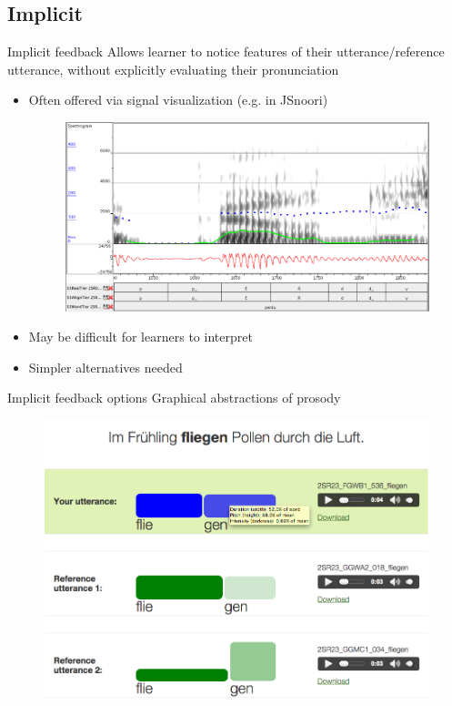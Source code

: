 \documentclass[xcolor={dvipsnames}]{beamer}
\begin{document}
	\subsection{Implicit}
		\begin{frame}{Implicit feedback}
		Allows learner to notice features of their utterance/reference utterance, without explicitly evaluating their pronunciation
		
		\begin{itemize}
		\item Often offered via signal visualization (e.g. in JSnoori)
			\begin{figure}
			\includegraphics[width=.75\textwidth]{JsnooriScreenshot}
			\end{figure}
			
		\item May be difficult for learners to interpret 
		\item Simpler alternatives needed
		\end{itemize}
		\end{frame}
		
		\begin{frame}{Implicit feedback options}
		Graphical abstractions of prosody
		\begin{figure}
		\includegraphics[width=.95
		\textwidth]{../img/screenshots/graphicalFB-comparison-2ref}
		\end{figure}
		\end{frame}
		
\end{document}
